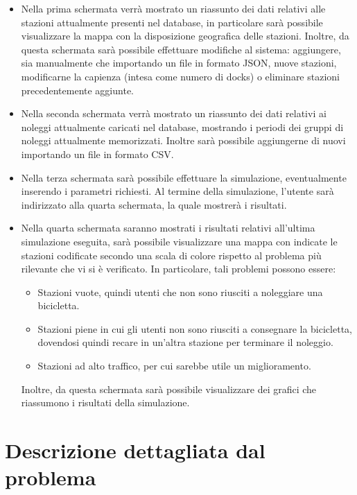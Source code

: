 \documentclass[a4paper, 12pt]{article}
\begin{document}
	\begin{itemize}
	\item Nella prima schermata verrà mostrato un riassunto dei dati relativi alle stazioni attualmente presenti nel database, in particolare sarà possibile visualizzare la mappa con la disposizione geografica delle stazioni. Inoltre, da questa schermata sarà possibile effettuare modifiche al sistema: aggiungere, sia manualmente che importando un file in formato JSON, nuove stazioni, modificarne la capienza (intesa come numero di docks) o eliminare stazioni precedentemente aggiunte.
	\item Nella seconda schermata verrà mostrato un riassunto dei dati relativi ai noleggi attualmente caricati nel database, mostrando i periodi dei gruppi di noleggi attualmente memorizzati. Inoltre sarà possibile aggiungerne di nuovi importando un file in formato CSV.
	\item Nella terza schermata sarà possibile effettuare la simulazione, eventualmente inserendo i parametri richiesti.
	Al termine della simulazione, l'utente sarà indirizzato alla quarta schermata, la quale mostrerà i risultati.
	\item Nella quarta schermata saranno mostrati i risultati relativi all'ultima simulazione eseguita, sarà possibile visualizzare una mappa con indicate le stazioni codificate secondo una scala di colore rispetto al problema più rilevante che vi si è verificato. In particolare, tali problemi possono essere:
		\begin{itemize}
		\item Stazioni vuote, quindi utenti che non sono riusciti a noleggiare una bicicletta.
		\item Stazioni piene in cui gli utenti non sono riusciti a consegnare la bicicletta, dovendosi quindi recare in un'altra stazione per terminare il noleggio.
		\item Stazioni ad alto traffico, per cui sarebbe utile un miglioramento.
		\end{itemize}
	Inoltre, da questa schermata sarà possibile visualizzare dei grafici che riassumono i risultati della simulazione.
	\end{itemize}

\newpage


\section{Descrizione dettagliata dal problema}
\end{document}
